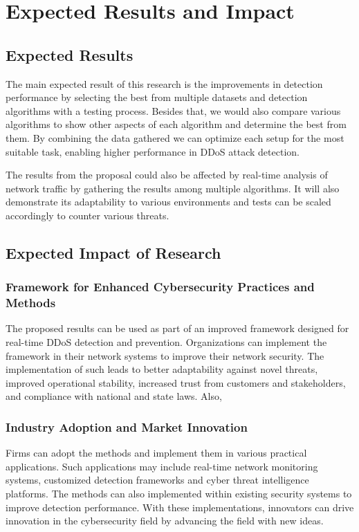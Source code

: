 \documentclass[a4paper, 12pt]{article}
\begin{document}
\clearpage

\section{Expected Results and Impact}

\subsection{Expected Results}
The main expected result of this research is the improvements in detection performance by selecting the best from multiple datasets and detection algorithms with a testing process. Besides that, we would also compare various algorithms to show other aspects of each algorithm and determine the best from them. By combining the data gathered we can optimize each setup for the most suitable task, enabling higher performance in DDoS attack detection. 

The results from the proposal could also be affected by real-time analysis of network traffic by gathering the results among multiple algorithms. It will also demonstrate its adaptability to various environments and tests can be scaled accordingly to counter various threats. 

\subsection{Expected Impact of Research}

\subsubsection{ Framework for Enhanced Cybersecurity Practices and Methods }

The proposed results can be used as part of an improved framework designed for real-time DDoS detection and prevention. Organizations can implement the framework in their network systems to improve their network security. The implementation of such leads to better adaptability against novel threats, improved operational stability, increased trust from customers and stakeholders, and compliance with national and state laws. Also, 

\subsubsection{ Industry Adoption and Market Innovation }

Firms can adopt the methods and implement them in various practical applications. Such applications may include real-time network monitoring systems, customized detection frameworks and cyber threat intelligence platforms. The methods can also implemented within existing security systems to improve detection performance. With these implementations, innovators can drive innovation in the cybersecurity field by advancing the field with new ideas.
\end{document}
